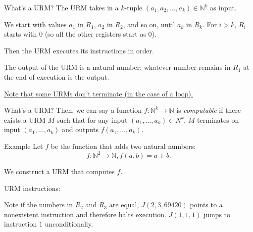 \documentclass{beamer}
\begin{document}
\begin{frame}{What's a URM?}
The URM takes in a $k$-tuple $(a_1, a_2, \ldots, a_k) \in \mathbb N^k$ as input.

\vspace{2mm}

We start with values $a_1$ in $R_1$, $a_2$ in $R_2$, and so on, until $a_k$ in $R_k$. For $i > k$, $R_i$ starts with $0$ (so all the other registers start as 0).

\begin{center}
\end{center}

\vspace{2mm}

Then the URM executes its instructions in order.

\vspace{2mm}

The output of the URM is a natural number: whatever number remains in $R_1$ at the end of execution is the output. 

\vspace{2mm}

\underline{Note that some URMs don't terminate (in the case of a loop).}
\end{frame}

\begin{frame}{What's a URM?}
Then, we can say a function $f: \mathbb N^k \to \mathbb N$ is \textit{computable} if there exists a URM $M$ such that for any input $(a_1, \ldots, a_k) \in N^k$, $M$ terminates on input $(a_1, \ldots, a_k)$ and outputs $f(a_1, \ldots, a_k)$.
\end{frame}

\begin{frame}{Example}
Let $f$ be the function that adds two natural numbers:
$$f: \mathbb N^2 \to \mathbb N, f(a, b) = a + b.$$

We construct a URM that computes $f$.

\vspace{4mm}

URM instructions:
\begin{algorithmic}[1]
\end{algorithmic}
Note if the numbers in $R_2$ and $R_3$ are equal, $J(2, 3, 69420)$ points to a nonexistent instruction and therefore halts execution. $J(1, 1, 1)$ jumps to instruction $1$ unconditionally.
\end{frame}
\end{document}
